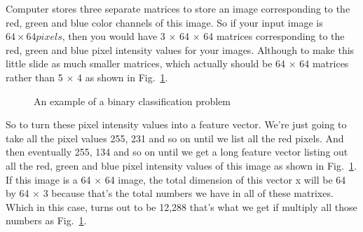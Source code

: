 \documentclass[a4paper]{article}
\begin{document}
Computer stores three separate matrices to store an image corresponding to the red, green and blue color channels of this image. So if your input image is $64\times 64pixels$, then you would have 3 $\times$ 64 $\times$ 64 matrices corresponding to the red, green and blue pixel intensity values for your images. Although to make this little slide as much smaller matrices, which actually should be 64 $\times$ 64 matrices rather than 5 $\times$ 4 as shown in Fig.~\ref{p1}.
\begin{figure}[b] 
	\centering 
	\caption{An example of a binary classification problem} 
	\label{p1} %
\end{figure}
So to turn these pixel intensity values into a feature vector. We're just going to take all the pixel values 255, 231 and so on until we list all the red pixels. And then eventually 255, 134 and so on until we get a long feature vector listing out all the red, green and blue pixel intensity values of this image as shown in Fig.~\ref{p1}. If this image is a 64 $\times$ 64 image, the total dimension of this vector x will be 64 by 64 $\times$ 3 because that's the total numbers we have in all of these matrixes. Which in this case, turns out to be 12,288 that's what we get if multiply all those numbers as Fig.~\ref{p1}. 
\end{document}
